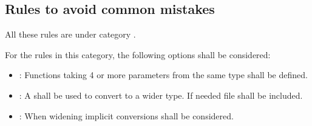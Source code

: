 \subsection{Rules to avoid common mistakes}

All these rules are under category
.

For the rules in this category, the following options shall be considered:

\begin{itemize}

\item {}: 
Functions taking 4 or more parameters from the same type shall be defined.

\item {}: 
A  shall be used to convert to a wider type.
If needed file  shall be included.

\item {}: 
When widening implicit conversions shall be considered.

\end{itemize}
